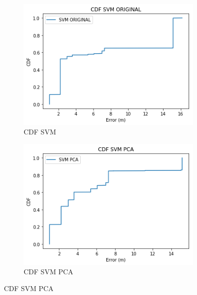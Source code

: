 \begin{figure}[ht!]
\begin{subfigure}{.5\textwidth}
  \centering
  \includegraphics[width=.8\linewidth]{figures/cdf-svm-estatico.png}
  \caption{CDF SVM}
  \label{fig:sub1}
\end{subfigure}%
\begin{subfigure}{.5\textwidth}
  \centering
  \includegraphics[width=.8\linewidth]{figures/cdf-svmPCA-estatico.png}
  \caption{CDF SVM PCA}
  \label{fig:sub2}
\end{subfigure}


\end{figure}
